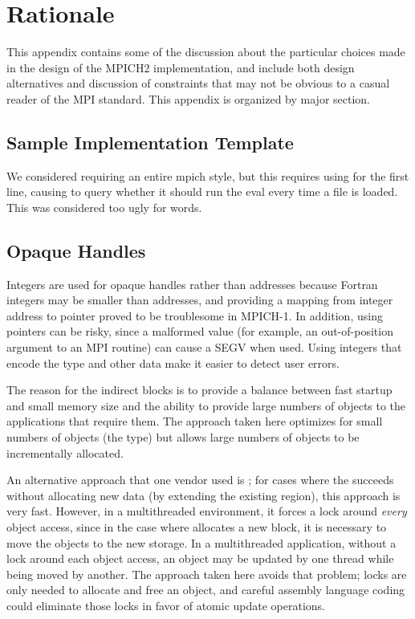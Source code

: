 \documentclass{article}
\begin{document}


\ifrationale
\section{Rationale}
\label{sec:rationale}

This appendix contains some of the discussion about the particular choices
made in the design of the MPICH2 implementation, and include both design
alternatives and discussion of constraints that may not be obvious to a casual
reader of the MPI standard.  This appendix is organized by major section.

\subsection{Sample Implementation Template}

We considered requiring an entire mpich style, but this requires using
 for the first line, causing  to query whether
it should run the eval every time a file is loaded.  This was
considered too ugly for words.

\subsection{Opaque Handles}
\label{sec:rationale-opaque-handles}

Integers are used for opaque handles rather than addresses because
Fortran integers may be smaller than addresses, and providing a
mapping from integer address to pointer proved to be troublesome in
MPICH-1.  In addition, using pointers can be risky, since a malformed
value (for example, an out-of-position argument to an MPI routine) can
cause a SEGV when used.  Using integers that encode the type and other
data make it easier to detect user errors.

The reason for the indirect blocks is to provide a balance between fast
startup and small memory size and the ability to provide large numbers of
objects to the applications that require them.  The approach taken here
optimizes for small numbers of objects (the  type) but
allows large numbers of objects to be incrementally allocated.

An alternative approach that one vendor used is ; for cases
where the  succeeds without allocating new data (by extending
the existing region), this approach is very fast.  However, in a multithreaded
environment, it forces a lock around \emph{every} object access, since in the
case where  allocates a new block, it is necessary to move the
objects to the new storage.  In a multithreaded application, without a lock
around each object access, an object may be updated by one thread while being
moved by another.  The approach taken here avoids that problem; locks are only
needed to allocate and free an object, and careful assembly language coding
could eliminate those locks in favor of atomic update operations.
\end{document}
